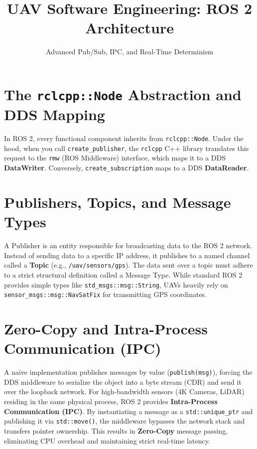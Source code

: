 \documentclass{article}
\title{UAV Software Engineering: ROS 2 Architecture}
\author{Advanced Pub/Sub, IPC, and Real-Time Determinism}
\date{}
\begin{document}
\maketitle

\section{The \texttt{rclcpp::Node} Abstraction and DDS Mapping}
In ROS 2, every functional component inherits from \texttt{rclcpp::Node}. Under the hood, when you call \texttt{create\_publisher}, the \texttt{rclcpp} C++ library translates this request to the \texttt{rmw} (ROS Middleware) interface, which maps it to a DDS \textbf{DataWriter}. Conversely, \texttt{create\_subscription} maps to a DDS \textbf{DataReader}. 

\section{Publishers, Topics, and Message Types}
A Publisher is an entity responsible for broadcasting data to the ROS 2 network. Instead of sending data to a specific IP address, it publishes to a named channel called a \textbf{Topic} (e.g., \texttt{/uav/sensors/gps}). 
The data sent over a topic must adhere to a strict structural definition called a Message Type. While standard ROS 2 provides simple types like \texttt{std\_msgs::msg::String}, UAVs heavily rely on \texttt{sensor\_msgs::msg::NavSatFix} for transmitting GPS coordinates.

\section{Zero-Copy and Intra-Process Communication (IPC)}
A naive implementation publishes messages by value (\texttt{publish(msg)}), forcing the DDS middleware to serialize the object into a byte stream (CDR) and send it over the loopback network. 
For high-bandwidth sensors (4K Cameras, LiDAR) residing in the same physical process, ROS 2 provides \textbf{Intra-Process Communication (IPC)}. By instantiating a message as a \texttt{std::unique\_ptr} and publishing it via \texttt{std::move()}, the middleware bypasses the network stack and transfers pointer ownership. This results in \textbf{Zero-Copy} message passing, eliminating CPU overhead and maintaining strict real-time latency.
\end{document}
